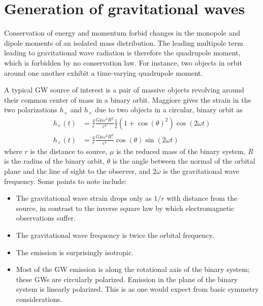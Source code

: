 \section{Generation of gravitational waves}

Conservation of energy and momentum forbid changes in the monopole and
dipole moments of an isolated mass distribution.  The leading
multipole term leading to gravitational wave radiation is therefore
the quadrupole moment, which is forbidden by no conservation law.  For
instance, two objects in orbit around one another exhibit a
time-varying quadrupole moment.


A typical GW source of interest is a pair of massive objects revolving
around their common center of mass in a binary orbit.
Maggiore\cite{Maggiore2008Gravitational} gives the strain in the two
polarizations $h_+$ and $h_\times$ due to two objects in a circular,
binary orbit as
%
\begin{align}
h_+(t)     &= \frac{4}{r} \frac{G \mu \omega^2 R^2}{c^4} \frac{1}{2} (1 + \cos(\theta)^2)  \cos (2 \omega t) \\
h_\times(t) &= \frac{4}{r} \frac{G \mu \omega^2 R^2}{c^4} \cos(\theta) \sin (2 \omega t)
\end{align}
where $r$ is the distance to source, $\mu$ is the reduced mass of the
binary system, $R$ is the radius of the binary orbit, $\theta$ is the
angle between the normal of the orbital plane and the line of sight to
the observer, and $2 \omega$ is the gravitational wave frequency. Some
points to note include:
\begin{itemize}
\item The gravitational wave strain drops only as $1/r$ with distance
  from the source, in contrast to the inverse square law by which
  electromagnetic observations suffer.
\item The gravitational wave frequency is twice the orbital frequency.
\item The emission is surprisingly isotropic.
\item Most of the GW emission is along the rotational axis of the
  binary system; these GWs are circularly polarized.  Emission in the
  plane of the binary system is linearly polarized.  This is as one
  would expect from basic symmetry considerations.
\end{itemize}

